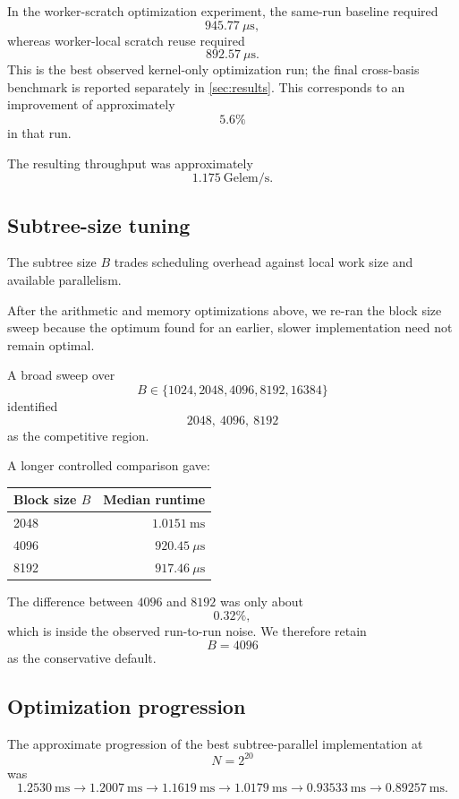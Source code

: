 In the worker-scratch optimization experiment, the same-run baseline required
\[
945.77\ \mu\mathrm{s},
\]
whereas worker-local scratch reuse required
\[
892.57\ \mu\mathrm{s}.
\]
This is the best observed kernel-only optimization run; the final
cross-basis benchmark is reported separately in \cref{sec:results}.
This corresponds to an improvement of approximately
\[
5.6\%
\]
in that run.

The resulting throughput was approximately
\[
1.175\ \mathrm{Gelem/s}.
\]

\subsection{Subtree-size tuning}

The subtree size \(B\) trades scheduling overhead against local work size
and available parallelism.

After the arithmetic and memory optimizations above, we re-ran the block
size sweep because the optimum found for an earlier, slower implementation
need not remain optimal.

A broad sweep over
\[
B\in
\{1024,2048,4096,8192,16384\}
\]
identified
\[
2048,\ 4096,\ 8192
\]
as the competitive region.

A longer controlled comparison gave:

\begin{center}
\begin{tabular}{lr}
\toprule
Block size \(B\) & Median runtime \\
\midrule
2048 & \(1.0151\ \mathrm{ms}\) \\
4096 & \(920.45\ \mu\mathrm{s}\) \\
8192 & \(917.46\ \mu\mathrm{s}\) \\
\bottomrule
\end{tabular}
\end{center}

The difference between \(4096\) and \(8192\) was only about
\[
0.32\%,
\]
which is inside the observed run-to-run noise.  We therefore retain
\[
\boxed{B=4096}
\]
as the conservative default.

\subsection{Optimization progression}

The approximate progression of the best subtree-parallel implementation at
\[
N=2^{20}
\]
was
\[
1.2530\ \mathrm{ms}
\rightarrow
1.2007\ \mathrm{ms}
\rightarrow
1.1619\ \mathrm{ms}
\rightarrow
1.0179\ \mathrm{ms}
\rightarrow
0.93533\ \mathrm{ms}
\rightarrow
\boxed{0.89257\ \mathrm{ms}}.
\]

